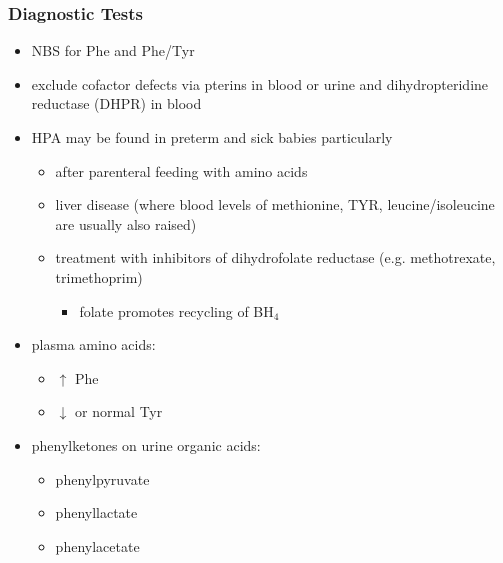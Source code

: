 \documentclass{scrartcl}
\begin{document}
\subsubsection{Diagnostic Tests}
\label{sec:orgeb0b4c0}
\begin{itemize}
\item NBS for Phe and Phe/Tyr
\item exclude cofactor defects via pterins in blood or urine and
dihydropteridine reductase (DHPR) in blood
\item HPA may be found in preterm and sick babies particularly
\begin{itemize}
\item after parenteral feeding with amino acids
\item liver disease (where blood levels of methionine, TYR,
leucine/isoleucine are usually also raised)
\item treatment with inhibitors of dihydrofolate reductase (e.g. methotrexate, trimethoprim)
\begin{itemize}
\item folate promotes recycling of BH\(_{\text{4}}\)
\end{itemize}
\end{itemize}
\item plasma amino acids:
\begin{itemize}
\item \(\uparrow\) Phe
\item \(\downarrow\) or normal Tyr
\end{itemize}
\item phenylketones on urine organic acids:
\begin{itemize}
\item phenylpyruvate
\item phenyllactate
\item phenylacetate
\end{itemize}
\end{itemize}
\end{document}
